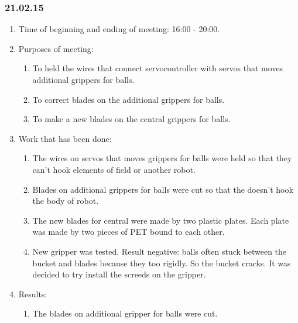 \subsubsection{21.02.15}
\begin{enumerate}
	
	\item Time of beginning and ending of meeting: 16:00 - 20:00.
	
	\item Purposes of meeting: 
	\begin{enumerate}
		
		\item To held the wires that connect servocontroller with servos that moves additional grippers for balls.
		
		\item To correct blades on the additional grippers for balls.
		
		\item To make a new blades on the central  grippers for balls.
		
	\end{enumerate}

	\item Work that has been done:
	\begin{enumerate}
		
		\item The wires on servos that moves grippers for balls were held so that they can't hook elements of field or another robot.
		
		\item Blades on additional grippers for balls were cut so that the doesn't hook the body of robot.
		
		\item The new blades for central were made by two plastic plates. Each plate was made by two pieces of PET bound to each other.
		
		\item New gripper was tested. Result negative: balls often stuck between the bucket and blades because they too rigidly. So the bucket cracks. It was decided to try install the screeds on the gripper.

	\end{enumerate}
	
	\item  Results:
	\begin{enumerate}
		
		\item The blades on additional gripper for balls were cut.
		

\end{enumerate}
\end{enumerate}

